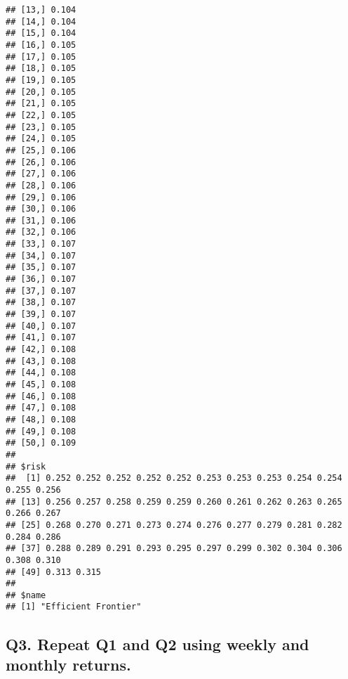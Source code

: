 \documentclass[]{article}
\newenvironment{Shaded}{\begin{snugshade}}{\end{snugshade}}
\newcommand{\DataTypeTok}[1]{\textcolor[rgb]{0.13,0.29,0.53}{#1}}
\newcommand{\DecValTok}[1]{\textcolor[rgb]{0.00,0.00,0.81}{#1}}
\newcommand{\KeywordTok}[1]{\textcolor[rgb]{0.13,0.29,0.53}{\textbf{#1}}}
\newcommand{\NormalTok}[1]{#1}
\newcommand{\OperatorTok}[1]{\textcolor[rgb]{0.81,0.36,0.00}{\textbf{#1}}}
\newcommand{\StringTok}[1]{\textcolor[rgb]{0.31,0.60,0.02}{#1}}
\begin{document}
\begin{verbatim}
## [13,] 0.104
## [14,] 0.104
## [15,] 0.104
## [16,] 0.105
## [17,] 0.105
## [18,] 0.105
## [19,] 0.105
## [20,] 0.105
## [21,] 0.105
## [22,] 0.105
## [23,] 0.105
## [24,] 0.105
## [25,] 0.106
## [26,] 0.106
## [27,] 0.106
## [28,] 0.106
## [29,] 0.106
## [30,] 0.106
## [31,] 0.106
## [32,] 0.106
## [33,] 0.107
## [34,] 0.107
## [35,] 0.107
## [36,] 0.107
## [37,] 0.107
## [38,] 0.107
## [39,] 0.107
## [40,] 0.107
## [41,] 0.107
## [42,] 0.108
## [43,] 0.108
## [44,] 0.108
## [45,] 0.108
## [46,] 0.108
## [47,] 0.108
## [48,] 0.108
## [49,] 0.108
## [50,] 0.109
## 
## $risk
##  [1] 0.252 0.252 0.252 0.252 0.252 0.253 0.253 0.253 0.254 0.254 0.255 0.256
## [13] 0.256 0.257 0.258 0.259 0.259 0.260 0.261 0.262 0.263 0.265 0.266 0.267
## [25] 0.268 0.270 0.271 0.273 0.274 0.276 0.277 0.279 0.281 0.282 0.284 0.286
## [37] 0.288 0.289 0.291 0.293 0.295 0.297 0.299 0.302 0.304 0.306 0.308 0.310
## [49] 0.313 0.315
## 
## $name
## [1] "Efficient Frontier"
\end{verbatim}

\hypertarget{q3.-repeat-q1-and-q2-using-weekly-and-monthly-returns.}{%
\subsection{Q3. Repeat Q1 and Q2 using weekly and monthly
returns.}\label{q3.-repeat-q1-and-q2-using-weekly-and-monthly-returns.}}

\begin{Shaded}
\end{Shaded}
\end{document}
